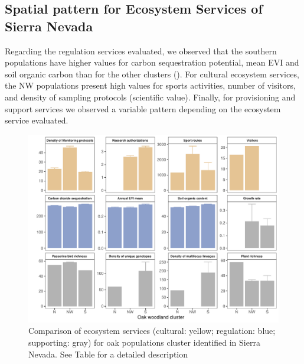 \subsection{Spatial pattern for Ecosystem Services of Sierra Nevada}\label{sec:es:spatial} 

Regarding the regulation services evaluated, we observed that the southern populations have higher values for carbon sequestration potential, mean EVI and soil organic carbon than for the other clusters (). For cultural ecosystem services, the NW populations present high values for sports activities, number of visitors, and density of sampling protocols (scientific value). Finally, for provisioning and support services we observed a variable pattern depending on the ecosystem service evaluated. 

\begin{figure}
    \centering
    \includegraphics[width=\textwidth]{img/es/es-plotSN.pdf}\caption{Comparison of ecosystem services (cultural: yellow; regulation: blue; supporting: gray) for oak populations cluster identified in Sierra Nevada. See Table  for a detailed description 
}\label{fig:es:oak-compare}
\end{figure}

